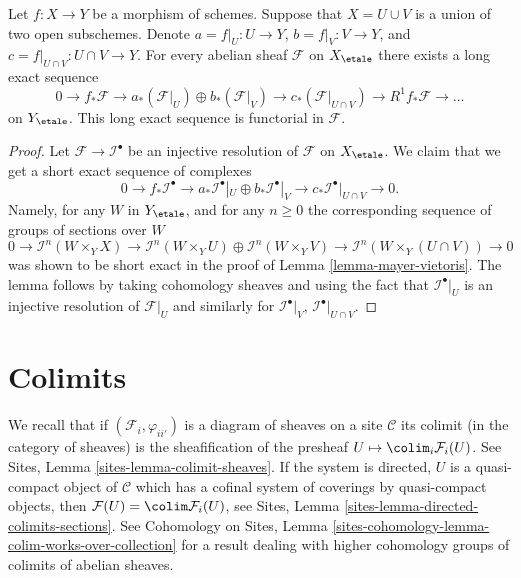 \begin{lemma}
\label{lemma-relative-mayer-vietoris}
Let $f : X \to Y$ be a morphism of schemes. Suppose that $X = U \cup V$
is a union of two open subschemes. Denote
$a = f|_U : U \to Y$, $b = f|_V : V \to Y$, and
$c = f|_{U \cap V} : U \cap V \to Y$.
For every abelian sheaf $\mathcal{F}$ on $X_\etale$
there exists a long exact sequence
$$
0 \to
f_*\mathcal{F} \to
a_*(\mathcal{F}|_U) \oplus b_*(\mathcal{F}|_V) \to
c_*(\mathcal{F}|_{U \cap V}) \to
R^1f_*\mathcal{F} \to \ldots
$$
on $Y_\etale$.
This long exact sequence is functorial in $\mathcal{F}$.
\end{lemma}

\begin{proof}
Let $\mathcal{F} \to \mathcal{I}^\bullet$ be an injective resolution
of $\mathcal{F}$ on $X_\etale$. We claim that we
get a short exact sequence of complexes
$$
0 \to
f_*\mathcal{I}^\bullet \to
a_*\mathcal{I}^\bullet|_U \oplus b_*\mathcal{I}^\bullet|_V \to
c_*\mathcal{I}^\bullet|_{U \cap V} \to
0.
$$
Namely, for any $W$ in $Y_\etale$, and for any $n \geq 0$ the
corresponding sequence of groups of sections over $W$
$$
0 \to
\mathcal{I}^n(W \times_Y X) \to
\mathcal{I}^n(W \times_Y U)
\oplus \mathcal{I}^n(W \times_Y V) \to
\mathcal{I}^n(W \times_Y (U \cap V)) \to
0
$$
was shown to be short exact in the proof of Lemma \ref{lemma-mayer-vietoris}.
The lemma follows by taking cohomology sheaves and using the fact that
$\mathcal{I}^\bullet|_U$ is an injective resolution of $\mathcal{F}|_U$
and similarly for $\mathcal{I}^\bullet|_V$, $\mathcal{I}^\bullet|_{U \cap V}$.
\end{proof}







\section{Colimits}
\label{section-colimit}

\noindent
We recall that if $(\mathcal{F}_i, \varphi_{ii'})$ is a diagram of sheaves on
a site $\mathcal{C}$ its colimit (in the category of sheaves) is the
sheafification of the presheaf $U \mapsto \colim_i \mathcal{F}_i(U)$. See
Sites, Lemma \ref{sites-lemma-colimit-sheaves}.
If the system is directed, $U$ is a quasi-compact object of
$\mathcal{C}$ which has a cofinal system of coverings by quasi-compact
objects, then $\mathcal{F}(U) = \colim \mathcal{F}_i(U)$, see
Sites, Lemma \ref{sites-lemma-directed-colimits-sections}.
See Cohomology on Sites, Lemma
\ref{sites-cohomology-lemma-colim-works-over-collection}
for a result dealing with higher cohomology groups of colimits
of abelian sheaves.

